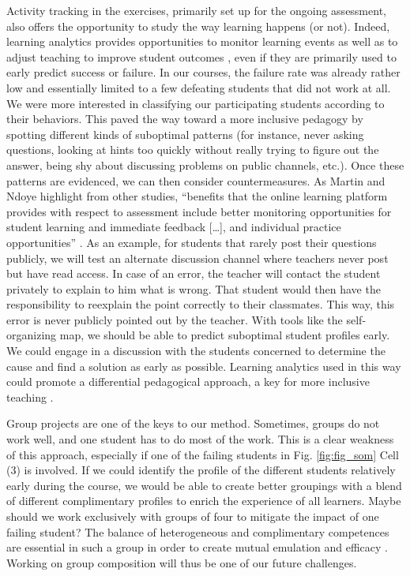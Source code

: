 \documentclass{aims}
\theoremstyle{definition}
\begin{document}
Activity tracking in the exercises, primarily set up for the ongoing
assessment, also offers the opportunity to study the way learning
happens (or not). Indeed, learning analytics provides opportunities to
monitor learning events as well as to adjust teaching to improve student
outcomes \cite{Martin2016, Romero2020}, even if they are primarily used
to early predict success or failure. In our courses, the failure rate
was already rather low and essentially limited to a few defeating
students that did not work at all. We were more interested in
classifying our participating students according to their behaviors.
This paved the way toward a more inclusive pedagogy by spotting
different kinds of suboptimal patterns (for instance, never asking
questions, looking at hints too quickly without really trying to figure
out the answer, being shy about discussing problems on public channels,
etc.). Once these patterns are evidenced, we can then consider
countermeasures. As Martin and Ndoye highlight from other studies,
``benefits that the online learning platform provides with respect to
assessment include better monitoring opportunities for student learning
and immediate feedback {[}\ldots{]}, and individual practice
opportunities'' \cite{Martin2016}. As an example, for students that
rarely post their questions publicly, we will test an alternate
discussion channel where teachers never post but have read access. In
case of an error, the teacher will contact the student privately to
explain to him what is wrong. That student would then have the
responsibility to reexplain the point correctly to their classmates.
This way, this error is never publicly pointed out by the teacher. With
tools like the self-organizing map, we should be able to predict
suboptimal student profiles early. We could engage in a discussion with
the students concerned to determine the cause and find a solution as
early as possible. Learning analytics used in this way could promote a
differential pedagogical approach, a key for more inclusive teaching
\cite{Siemens2013}.

Group projects are one of the keys to our method. Sometimes, groups do
not work well, and one student has to do most of the work. This is a
clear weakness of this approach, especially if one of the failing
students in Fig. \ref {fig:fig_som} Cell (3) is involved. If we could
identify the profile of the different students relatively early during
the course, we would be able to create better groupings with a blend of
different complimentary profiles to enrich the experience of all
learners. Maybe should we work exclusively with groups of four to
mitigate the impact of one failing student? The balance of heterogeneous
and complimentary competences are essential in such a group in order to
create mutual emulation and efficacy \cite{Mucchielli1996}. Working on
group composition will thus be one of our future challenges.
\end{document}
